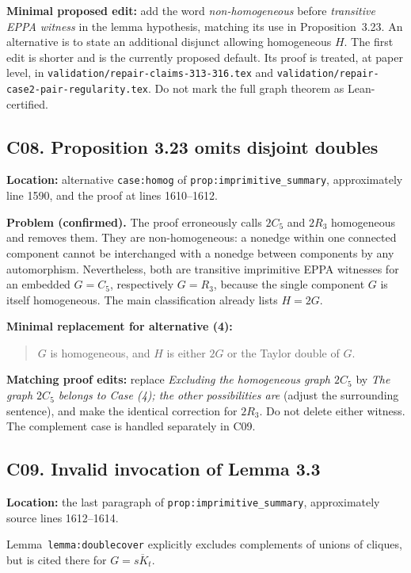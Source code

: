 \documentclass[11pt,a4paper]{article}
\begin{document}
\textbf{Minimal proposed edit:} add the word
\emph{non-homogeneous} before \emph{transitive EPPA witness}
in the lemma hypothesis, matching its use in
Proposition~3.23. An alternative is to state an
additional disjunct allowing homogeneous \(H\).
The first edit is shorter and is the currently proposed
default. Its proof is treated, at paper level, in
\texttt{validation/repair-claims-313-316.tex} and
\texttt{validation/repair-case2-pair-regularity.tex}.
Do not mark the full graph theorem as Lean-certified.

\subsection*{C08. Proposition 3.23 omits disjoint doubles}
\textbf{Location:} alternative \texttt{case:homog} of
\texttt{prop:imprimitive\_summary}, approximately
line 1590, and the proof at lines 1610--1612.

\textbf{Problem (confirmed).} The proof erroneously
calls \(2C_5\) and \(2R_3\) homogeneous and removes them.
They are non-homogeneous: a nonedge within one connected
component cannot be interchanged with a nonedge between
components by any automorphism. Nevertheless, both are
transitive imprimitive EPPA witnesses for an embedded
\(G=C_5\), respectively \(G=R_3\), because the single
component \(G\) is itself homogeneous. The main
classification already lists \(H=2G\).

\textbf{Minimal replacement for alternative (4):}
\begin{quote}
\(G\) is homogeneous, and \(H\) is either \(2G\)
or the Taylor double of \(G\).
\end{quote}

\textbf{Matching proof edits:}
replace \emph{Excluding the homogeneous graph \(2C_5\)}
by \emph{The graph \(2C_5\) belongs to Case (4); the
other possibilities are} (adjust the surrounding
sentence), and make the identical correction for \(2R_3\).
Do not delete either witness. The complement case
is handled separately in C09.

\subsection*{C09. Invalid invocation of Lemma 3.3}
\textbf{Location:} the last paragraph of
\texttt{prop:imprimitive\_summary},
approximately source lines 1612--1614.

Lemma~\texttt{lemma:doublecover} explicitly excludes
complements of unions of cliques, but is cited there
for \(G=\overline{sK_t}\).
\end{document}

